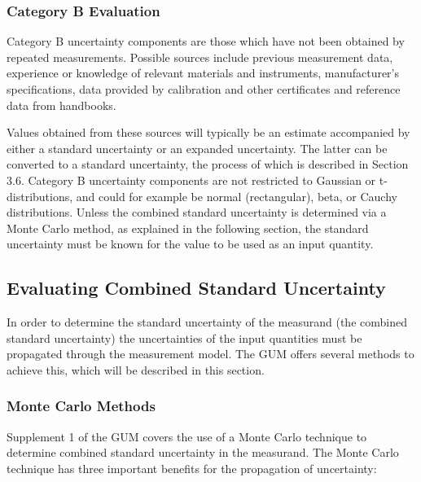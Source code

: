 \documentclass[../thesis/thesis.tex]{subfiles}
\begin{document}
\begin{refsection}
\subsubsection{Category B Evaluation}

Category B uncertainty components are those which have not been obtained by repeated measurements. Possible sources include previous measurement data, experience or knowledge of relevant materials and instruments, manufacturer’s specifications, data provided by calibration and other certificates and reference data from handbooks.

Values obtained from these sources will typically be an estimate accompanied by either a standard uncertainty or an expanded uncertainty. The latter can be converted to a standard uncertainty, the process of which is described in Section 3.6. Category B uncertainty components are not restricted to Gaussian or t-distributions, and could for example be normal (rectangular), beta, or Cauchy distributions. Unless the combined standard uncertainty is determined via a Monte Carlo method, as explained in the following section, the standard uncertainty must be known for the value to be used as an input quantity.

\subsection{Evaluating Combined Standard Uncertainty}

In order to determine the standard uncertainty of the measurand (the combined standard uncertainty) the uncertainties of the input quantities must be propagated through the measurement model. The GUM offers several methods to achieve this, which will be described in this section.

\subsubsection{Monte Carlo Methods}

Supplement 1 of the GUM \cite{GUM_S1} covers the use of a Monte Carlo technique to determine combined standard uncertainty in the measurand. The Monte Carlo technique has three important benefits for the propagation of uncertainty:


\end{refsection}
\end{document}
